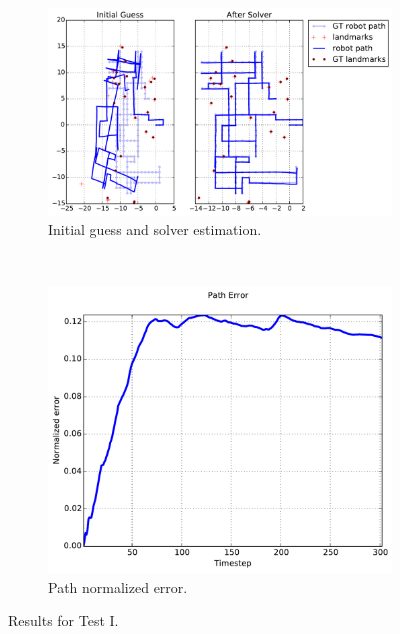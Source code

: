 {\begin{figure}[htbp!]
\centering
\begin{subfigure}[b]{\estWidth\textwidth}
\includegraphics[width=\textwidth]{imagenes/tests/known/res_it_20_nl_40_op_1000_oa_1000_lp_1000_ds_300_kw_1.pdf}
\caption{Initial guess and solver estimation.}
\label{fig:test-ia}
\end{subfigure}\\
\begin{subfigure}[b]{\errorWidth\textwidth}
\includegraphics[width=\textwidth]{imagenes/tests/known/res_it_20_nl_40_op_1000_oa_1000_lp_1000_ds_300_kw_1_path.pdf}
\caption{Path normalized error.}
\label{fig:test-ib}
\end{subfigure}
\caption{Results for Test I.}
\label{fig:test-i}
\end{figure}
}

